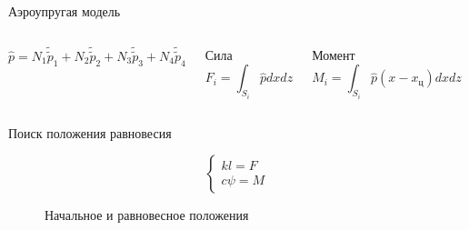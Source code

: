 \documentclass[ignoreonframetext,unicode]{beamer}
\begin{document}
\begin{frame}{Аэроупругая модель}
	\vspace*{-2mm}
		\begin{columns}	
			\begin{block}{}
				\vspace*{-4mm}
				\begin{equation*}
					\hat{p}	= N_1 \tilde{\tilde{p}}_1 + N_2 \tilde{\tilde{p}}_2 + N_3 \tilde{\tilde{p}}_3 + N_4 \tilde{\tilde{p}}_4
				\end{equation*}
			\end{block}
				\column{0.2\textwidth}
	\begin{block}{Сила}
		\vspace*{-6mm}
		\begin{equation*}{\scriptstyle 
			F_i = \int_{S_i} { \hat{p}   dx dz}
		}
		\end{equation*}
	\end{block}
	\column{0.3\textwidth}
	\begin{block}{Момент}
		\vspace*{-6mm}
		\begin{equation*}
			{\scriptstyle 
			M_i = \int_{S_i} {\hat{p}  \left(x - x_{\text{ц}} \right)  dx dz}
		}
		\end{equation*}
	\end{block}
\end{columns}


	
\end{frame}

\begin{frame}{Поиск положения равновесия}

			\begin{block}{}
			\begin{equation*}
				\begin{cases*}
					k l = F \\
					c \psi = M
				\end{cases*}
				\label{temp_ldsfsdfsdfagr}
			\end{equation*}
			\end{block}
\vspace*{-1mm}
\begin{figure}[!htbp]
	\caption{Начальное и равновесное положения}
	\label{res_chasdasdaeck_func_2}
\end{figure}



\end{frame}
\end{document}

